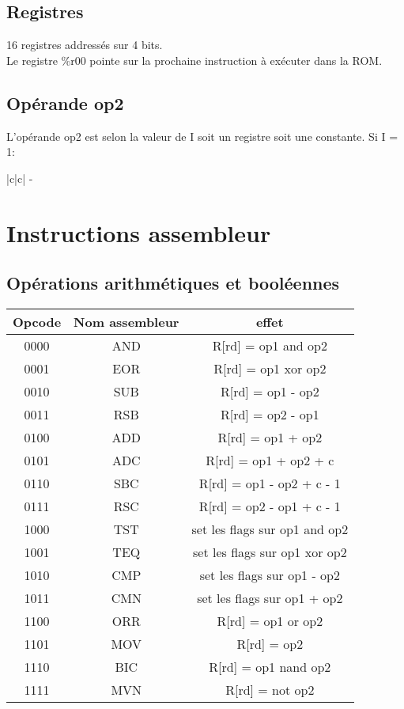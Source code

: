 \documentclass[a4paper]{article}
\begin{document}
\begin{tabular}{}
\subsection{Registres}
16 registres addressés sur 4 bits.\\
Le registre \%r00 pointe sur la prochaine instruction à exécuter dans la ROM.
\subsection{Opérande op2}
L'opérande op2 est selon la valeur de I soit un registre soit une constante.
Si I = 1:
\begin{tabular}{|c|c|}
   -

\section{Instructions assembleur}

\subsection{Opérations arithmétiques et booléennes}

\begin{tabular}{|c|c|c|}
  \hline
  Opcode & Nom assembleur & effet \\
  \hline
  0000 & AND & R[rd] = op1 and op2\\
  0001 & EOR & R[rd] = op1 xor op2\\
  0010 & SUB & R[rd] = op1 - op2\\
  0011 & RSB & R[rd] = op2 - op1\\
  0100 & ADD & R[rd] = op1 + op2\\
  0101 & ADC & R[rd] = op1 + op2 + c\\
  0110 & SBC & R[rd] = op1 - op2 + c - 1\\
  0111 & RSC & R[rd] = op2 - op1 + c - 1\\
  1000 & TST & set les flags sur op1 and op2\\
  1001 & TEQ & set les flags sur op1 xor op2\\
  1010 & CMP & set les flags sur op1 - op2\\
  1011 & CMN & set les flags sur op1 + op2\\
  1100 & ORR & R[rd] = op1 or op2\\
  1101 & MOV & R[rd] = op2\\
  1110 & BIC & R[rd] = op1 nand op2\\
  1111 & MVN & R[rd] = not op2\\
  \hline
\end{tabular}


\end{tabular}
\end{tabular}
\end{document}
